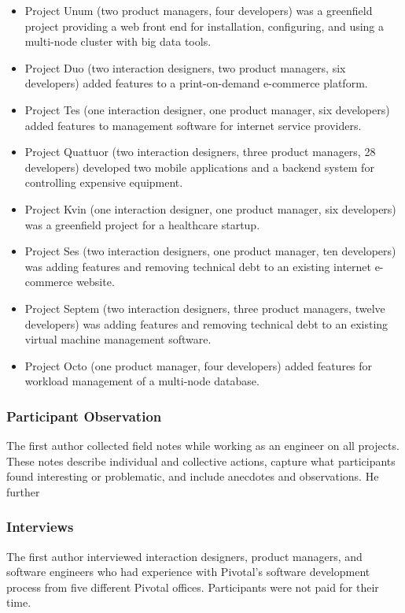 \begin{itemize}
\item Project Unum (two product managers, four developers) was a greenfield project providing a web front end for installation, configuring, and using a multi-node cluster with big data tools. 
\item Project Duo (two interaction designers, two product managers, six developers) added features to a print-on-demand e-commerce platform. 
\item Project Tes (one interaction designer, one product manager, six developers) added features to management software for internet service providers.
\item Project Quattuor (two interaction designers, three product managers, 28 developers) developed two mobile applications and a backend system for controlling expensive equipment.
\item Project Kvin (one interaction designer, one product manager, six developers) was a greenfield project for a healthcare startup. 
\item Project Ses (two interaction designers, one product manager, ten developers) was adding features and removing technical debt to an existing internet e-commerce website.
\item Project Septem (two interaction designers, three product managers, twelve developers) was adding features and removing technical debt to an existing virtual machine management software.
\item Project Octo (one product manager, four developers) added features for  workload management of a multi-node database.
\end{itemize}
\subsubsection{Participant Observation}
The first author collected field notes while working as an engineer on all \numberOfObservedProjects{} projects. These notes describe individual and collective actions, capture what participants found interesting or problematic, and include anecdotes and observations. He further 
\subsubsection{Interviews}
The first author interviewed \numberOfInterviews{} interaction designers, product managers, and software engineers who had experience with Pivotal's software development process from five different Pivotal offices. Participants were not paid for their time.

